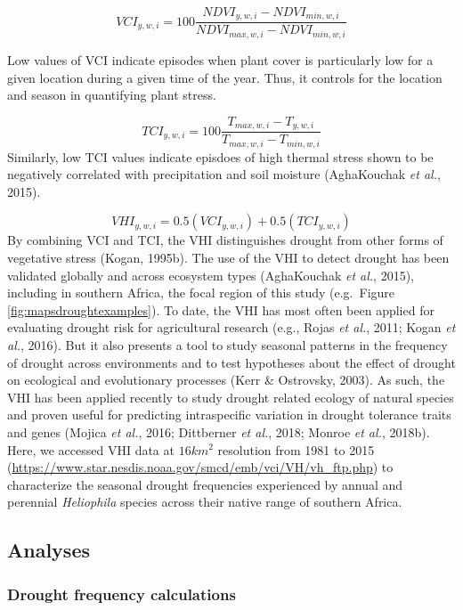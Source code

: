 \documentclass[man,floatsintext]{apa6}
\theoremstyle{definition}
\theoremstyle{definition}
\theoremstyle{definition}
\theoremstyle{remark}
\begin{document}
\[VCI_{y,w,i} = 100\frac{NDVI_{y,w,i} - NDVI_{min,w,i}}{NDVI_{max,w,i} - NDVI_{min,w,i}}\]

Low values of VCI indicate episodes when plant cover is particularly low
for a given location during a given time of the year. Thus, it controls
for the location and season in quantifying plant stress.

\[TCI_{y,w,i} = 100\frac{T_{max,w,i}-T_{y,w,i}}{T_{max,w,i} - T_{min,w,i}}\]
Similarly, low TCI values indicate episdoes of high thermal stress shown
to be negatively correlated with precipitation and soil moisture
(AghaKouchak \emph{et al.}, 2015).

\[VHI_{y,w,i} = 0.5(VCI_{y,w,i}) + 0.5(TCI_{y,w,i})\] By combining VCI
and TCI, the VHI distinguishes drought from other forms of vegetative
stress (Kogan, 1995b). The use of the VHI to detect drought has been
validated globally and across ecosystem types (AghaKouchak \emph{et
al.}, 2015), including in southern Africa, the focal region of this
study (e.g.~Figure \ref{fig:mapsdroughtexamples}). To date, the VHI has
most often been applied for evaluating drought risk for agricultural
research (e.g., Rojas \emph{et al.}, 2011; Kogan \emph{et al.}, 2016).
But it also presents a tool to study seasonal patterns in the frequency
of drought across environments and to test hypotheses about the effect
of drought on ecological and evolutionary processes (Kerr \& Ostrovsky,
2003). As such, the VHI has been applied recently to study drought
related ecology of natural species and proven useful for predicting
intraspecific variation in drought tolerance traits and genes (Mojica
\emph{et al.}, 2016; Dittberner \emph{et al.}, 2018; Monroe \emph{et
al.}, 2018b). Here, we accessed VHI data at \(16km^2\) resolution from
1981 to 2015
(\url{https://www.star.nesdis.noaa.gov/smcd/emb/vci/VH/vh_ftp.php}) to
characterize the seasonal drought frequencies experienced by annual and
perennial \emph{Heliophila} species across their native range of
southern Africa.

\hypertarget{analyses}{%
\subsection{Analyses}\label{analyses}}

\hypertarget{drought-frequency-calculations}{%
\subsubsection{Drought frequency
calculations}\label{drought-frequency-calculations}}
\end{document}
